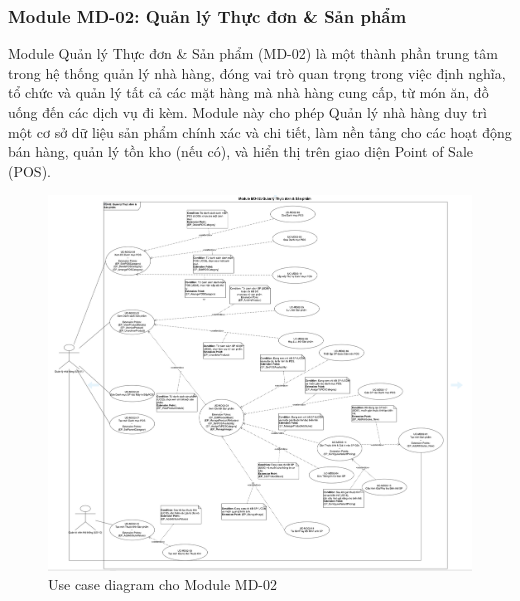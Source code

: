 \subsubsection{Module MD-02: Quản lý Thực đơn \& Sản phẩm}
Module Quản lý Thực đơn \& Sản phẩm (MD-02) là một thành phần trung tâm trong hệ thống quản lý nhà hàng, đóng vai trò quan trọng trong việc định nghĩa, tổ chức và quản lý tất cả các mặt hàng mà nhà hàng cung cấp, từ món ăn, đồ uống đến các dịch vụ đi kèm. Module này cho phép Quản lý nhà hàng duy trì một cơ sở dữ liệu sản phẩm chính xác và chi tiết, làm nền tảng cho các hoạt động bán hàng, quản lý tồn kho (nếu có), và hiển thị trên giao diện Point of Sale (POS).


\begin{figure}[H]
    \centering
    \includegraphics[width=15cm]{Sections/tong_quan/functional_spec/img/uc2.png}
    \vspace{0.5cm}
    \caption{Use case diagram cho Module MD-02}
    \label{fig:my_label}
\end{figure}

